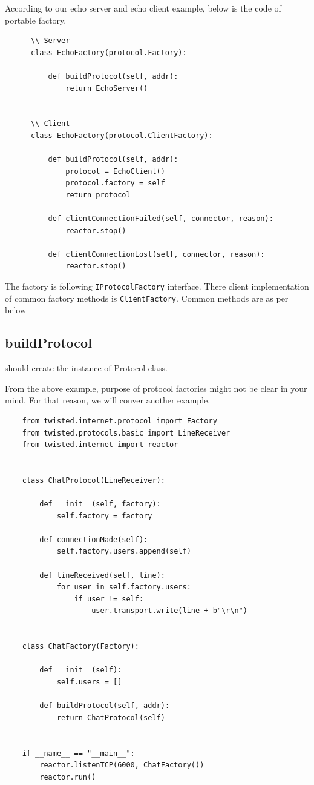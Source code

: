\documentclass{article}
\begin{document}
    According to our echo server and echo client example, below is the code of
    portable factory.

    \begin{verbatim}
      \\ Server
      class EchoFactory(protocol.Factory):

          def buildProtocol(self, addr):
              return EchoServer()


      \\ Client
      class EchoFactory(protocol.ClientFactory):

          def buildProtocol(self, addr):
              protocol = EchoClient()
              protocol.factory = self
              return protocol

          def clientConnectionFailed(self, connector, reason):
              reactor.stop()

          def clientConnectionLost(self, connector, reason):
              reactor.stop()
    \end{verbatim}

    The factory is following \texttt{IProtocolFactory} interface. There client
    implementation of common factory methods is \texttt{ClientFactory}. Common
    methods are as per below

    \subsection{buildProtocol} should create the instance of Protocol class.

    From the above example, purpose of protocol factories might not be clear in
    your mind. For that reason, we will conver another example.

    \begin{verbatim}
    from twisted.internet.protocol import Factory
    from twisted.protocols.basic import LineReceiver
    from twisted.internet import reactor


    class ChatProtocol(LineReceiver):

        def __init__(self, factory):
            self.factory = factory

        def connectionMade(self):
            self.factory.users.append(self)

        def lineReceived(self, line):
            for user in self.factory.users:
                if user != self:
                    user.transport.write(line + b"\r\n")


    class ChatFactory(Factory):

        def __init__(self):
            self.users = []

        def buildProtocol(self, addr):
            return ChatProtocol(self)


    if __name__ == "__main__":
        reactor.listenTCP(6000, ChatFactory())
        reactor.run()
    \end{verbatim}
\end{document}
